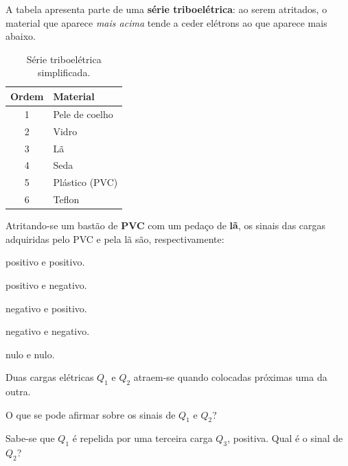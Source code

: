 \begin{questao}[1]{}
A tabela apresenta parte de uma \textbf{série triboelétrica}: ao serem atritados,
o material que aparece \emph{mais acima} tende a ceder elétrons ao que aparece
mais abaixo.
\begin{table}[H]
\centering
\small\sffamily
\setlength{\arrayrulewidth}{0.5pt}
\begin{tabular}{@{}c l@{}}
\toprule
\textbf{Ordem} & \textbf{Material}\\
\midrule
1 & Pele de coelho\\
2 & Vidro\\
3 & Lã\\
4 & Seda\\
5 & Plástico (PVC)\\
6 & Teflon\\
\bottomrule
\end{tabular}
\caption{Série triboelétrica simplificada.}
\end{table}
Atritando-se um bastão de \textbf{PVC} com um pedaço de \textbf{lã}, os sinais das
cargas adquiridas pelo PVC e pela lã são, respectivamente:
\begin{alternativas}[2]
\item positivo e positivo.
\item positivo e negativo.
\item negativo e positivo.
\item negativo e negativo.
\item nulo e nulo.
\end{alternativas}
\end{questao}

\begin{questao}[1]{}
Duas cargas elétricas $Q_1$ e $Q_2$ atraem-se quando colocadas próximas uma da outra.
\begin{itensq}
\item O que se pode afirmar sobre os sinais de $Q_1$ e $Q_2$?
\item Sabe-se que $Q_1$ é repelida por uma terceira carga $Q_3$, positiva.
      Qual é o sinal de $Q_2$?
\end{itensq}
\end{questao}

